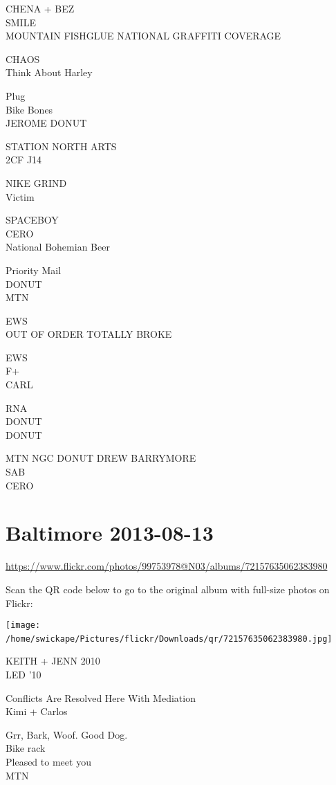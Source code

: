 \documentclass[10pt,letterpaper]{article}
\begin{document}
CHENA + BEZ\\
SMILE\\
MOUNTAIN FISHGLUE NATIONAL GRAFFITI COVERAGE

CHAOS\\
Think About Harley

Plug\\
Bike Bones\\
JEROME DONUT

STATION NORTH ARTS\\
2CF J14

NIKE GRIND\\
Victim

SPACEBOY\\
CERO\\
National Bohemian Beer

Priority Mail\\
DONUT\\
MTN

EWS\\
OUT OF ORDER TOTALLY BROKE

EWS\\
F+\\
CARL

RNA\\
DONUT\\
DONUT

MTN NGC DONUT DREW BARRYMORE\\
SAB\\
CERO
\

\section*{Baltimore 2013-08-13}

\url{https://www.flickr.com/photos/99753978@N03/albums/72157635062383980}

Scan the QR code below to go to the original album with full-size photos on Flickr:

\texttt{[image: /home/swickape/Pictures/flickr/Downloads/qr/72157635062383980.jpg]}
\

KEITH + JENN 2010\\
LED '10

Conflicts Are Resolved Here With Mediation\\
Kimi + Carlos

Grr, Bark, Woof.  Good Dog.\\
Bike rack\\
Pleased to meet you\\
MTN
\end{document}
